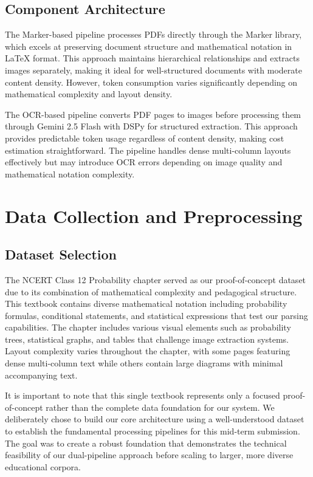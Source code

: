 \documentclass[12pt]{article}
\begin{document}
\subsection{Component Architecture}

The Marker-based pipeline processes PDFs directly through the Marker library, which excels at preserving document structure and mathematical notation in LaTeX format. This approach maintains hierarchical relationships and extracts images separately, making it ideal for well-structured documents with moderate content density. However, token consumption varies significantly depending on mathematical complexity and layout density.

The OCR-based pipeline converts PDF pages to images before processing them through Gemini 2.5 Flash with DSPy for structured extraction. This approach provides predictable token usage regardless of content density, making cost estimation straightforward. The pipeline handles dense multi-column layouts effectively but may introduce OCR errors depending on image quality and mathematical notation complexity.

\section{Data Collection and Preprocessing}

\subsection{Dataset Selection}

The NCERT Class 12 Probability chapter served as our proof-of-concept dataset due to its combination of mathematical complexity and pedagogical structure. This textbook contains diverse mathematical notation including probability formulas, conditional statements, and statistical expressions that test our parsing capabilities. The chapter includes various visual elements such as probability trees, statistical graphs, and tables that challenge image extraction systems. Layout complexity varies throughout the chapter, with some pages featuring dense multi-column text while others contain large diagrams with minimal accompanying text.

It is important to note that this single textbook represents only a focused proof-of-concept rather than the complete data foundation for our system. We deliberately chose to build our core architecture using a well-understood dataset to establish the fundamental processing pipelines for this mid-term submission. The goal was to create a robust foundation that demonstrates the technical feasibility of our dual-pipeline approach before scaling to larger, more diverse educational corpora.
\end{document}

